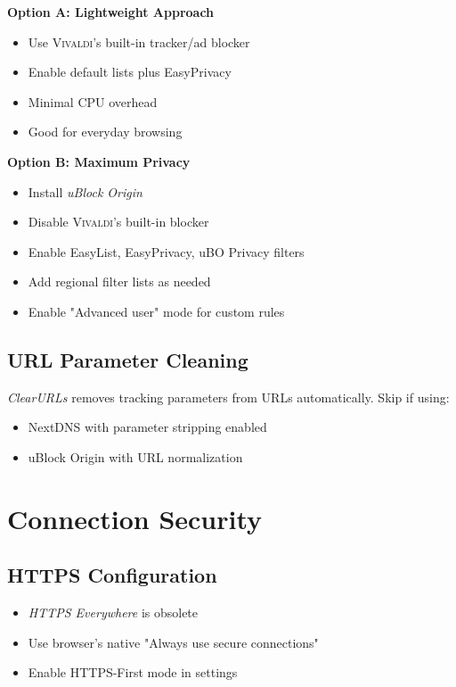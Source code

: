 \documentclass[11pt,a4paper,oneside]{book}
\newcommand{\vivaldi}{\textsc{Vivaldi}}
\newcommand{\extension}[1]{\textit{\color{primaryblue}#1}}
\begin{document}
\textbf{Option A: Lightweight Approach}
\begin{itemize}
    \item Use \vivaldi{}'s built-in tracker/ad blocker
    \item Enable default lists plus EasyPrivacy
    \item Minimal CPU overhead
    \item Good for everyday browsing
\end{itemize}

\textbf{Option B: Maximum Privacy}
\begin{itemize}
    \item Install \extension{uBlock Origin}
    \item Disable \vivaldi{}'s built-in blocker
    \item Enable EasyList, EasyPrivacy, uBO Privacy filters
    \item Add regional filter lists as needed
    \item Enable "Advanced user" mode for custom rules
\end{itemize}

\subsection{URL Parameter Cleaning}

\extension{ClearURLs} removes tracking parameters from URLs automatically. Skip if using:
\begin{itemize}
    \item NextDNS with parameter stripping enabled
    \item uBlock Origin with URL normalization
\end{itemize}

\section{Connection Security}

\subsection{HTTPS Configuration}

\begin{itemize}
    \item \extension{HTTPS Everywhere} is obsolete
    \item Use browser's native "Always use secure connections"
    \item Enable HTTPS-First mode in settings
\end{itemize}
\end{document}
